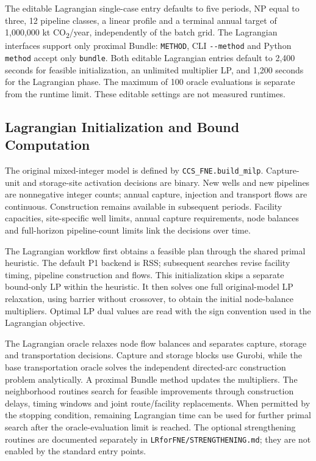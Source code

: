 \documentclass[11pt,letterpaper]{article}
\newcommand{\co}{CO\textsubscript{2}}
\newcommand{\file}[1]{\texttt{\small\nolinkurl{#1}}}
\begin{document}
The editable Lagrangian single-case entry defaults to five periods, NP equal to three, 12 pipeline classes, a linear profile and a terminal annual target of 1,000,000 kt \co/year, independently of the batch grid. The Lagrangian interfaces support only proximal Bundle: \file{METHOD}, CLI \file{--method} and Python \file{method} accept only \file{bundle}. Both editable Lagrangian entries default to 2,400 seconds for feasible initialization, an unlimited multiplier LP, and 1,200 seconds for the Lagrangian phase. The maximum of 100 oracle evaluations is separate from the runtime limit. These editable settings are not measured runtimes.

\subsection{Lagrangian Initialization and Bound Computation}

The original mixed-integer model is defined by \file{CCS_FNE.build_milp}. Capture-unit and storage-site activation decisions are binary. New wells and new pipelines are nonnegative integer counts; annual capture, injection and transport flows are continuous. Construction remains available in subsequent periods. Facility capacities, site-specific well limits, annual capture requirements, node balances and full-horizon pipeline-count limits link the decisions over time.

The Lagrangian workflow first obtains a feasible plan through the shared primal heuristic. The default P1 backend is RSS; subsequent searches revise facility timing, pipeline construction and flows. This initialization skips a separate bound-only LP within the heuristic. It then solves one full original-model LP relaxation, using barrier without crossover, to obtain the initial node-balance multipliers. Optimal LP dual values are read with the sign convention used in the Lagrangian objective.

The Lagrangian oracle relaxes node flow balances and separates capture, storage and transportation decisions. Capture and storage blocks use Gurobi, while the base transportation oracle solves the independent directed-arc construction problem analytically. A proximal Bundle method updates the multipliers. The neighborhood routines search for feasible improvements through construction delays, timing windows and joint route/facility replacements. When permitted by the stopping condition, remaining Lagrangian time can be used for further primal search after the oracle-evaluation limit is reached. The optional strengthening routines are documented separately in \file{LRforFNE/STRENGTHENING.md}; they are not enabled by the standard entry points.
\end{document}
